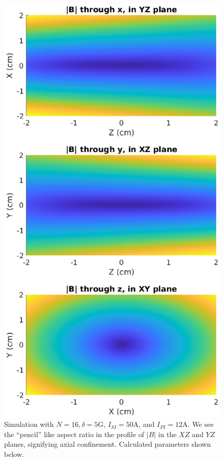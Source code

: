 \documentclass{article}
\theoremstyle{definition}
\begin{document}
\begin{figure}[!htb]
\begin{minipage}{.49\textwidth}
		\includegraphics[width=\linewidth]{sim-figs/IP-2.eps}
	\end{minipage}%
	\caption{Simulation with $N = 16, \delta = 5$G, $I_{SI} = 50$A, and $I_{PI}=12$A. We see the ``pencil'' like aspect ratio in the profile of $|B|$ in the $XZ$ and $YZ$ planes, signifying axial confinement. Calculated parameters shown below.}
\end{figure}
\end{document}
